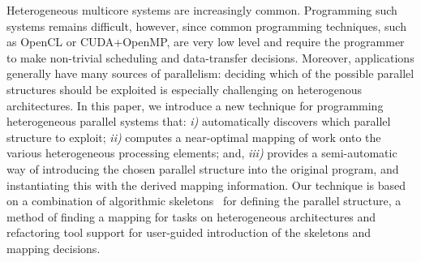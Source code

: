 \documentclass[smallextended]{svjour3}
\begin{document}
\noindent
Heterogeneous multicore systems are increasingly common.
Programming such systems remains difficult, however, since
common programming techniques, such as OpenCL or CUDA+OpenMP,
are very low level and 
require the programmer to make non-trivial scheduling and data-transfer decisions.
Moreover, applications generally have many sources of parallelism: deciding
which of the possible parallel structures should be exploited is especially challenging on heterogenous architectures.
%
In this paper, we introduce a new technique for programming heterogeneous parallel systems
that: \emph{i)} automatically discovers which parallel structure to exploit; \emph{ii)} computes a near-optimal mapping of work onto
the various heterogeneous processing elements; and, \emph{iii)} provides a semi-automatic way of
introducing the chosen parallel structure into the original program, and instantiating this with the derived mapping information.
Our technique is based on a combination of algorithmic skeletons~\cite{cole-th} for defining the parallel structure, %
 a method of finding a mapping for tasks on
 heterogeneous architectures%
 and refactoring tool support for user-guided introduction of the skeletons and mapping decisions. 
\end{document}
